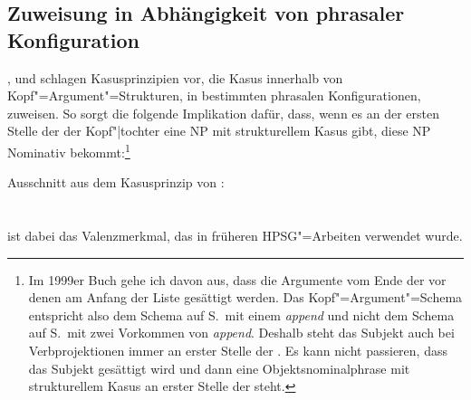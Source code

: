 \subsection{Zuweisung in Abhängigkeit von phrasaler Konfiguration}

\mbox{},  und 
schlagen Kasusprinzipien vor, die Kasus innerhalb von Kopf"=Argument"=Strukturen, \dash in bestimmten
phrasalen Konfigurationen, zuweisen. So sorgt \zb die folgende Implikation dafür,
dass, wenn es an der ersten Stelle der \subcatl der Kopf"|tochter eine NP mit strukturellem
Kasus gibt, diese NP Nominativ bekommt:\footnote{
  Im 1999er Buch gehe ich davon aus, dass die Argumente vom Ende der \subcatl vor denen am Anfang der
  Liste gesättigt werden. Das Kopf"=Argument"=Schema entspricht also dem Schema auf
  S.\,\pageref{schema-bin-prel} mit einem \emph{append} und nicht dem Schema auf
  S.\,\pageref{schema-Kopf-Komplementschema-prel2} mit zwei Vorkommen von \emph{append}. Deshalb steht das Subjekt auch bei
  Verbprojektionen immer an erster Stelle der \subcatl. Es kann nicht passieren, dass das Subjekt
  gesättigt wird und dann eine Objektsnominalphrase mit strukturellem Kasus an erster Stelle der \subcatl steht.%
}

\eas
{}%
Ausschnitt aus dem Kasusprinzip von :\\
 ~\impl \\\\
\hfill{}
\zs
\subcat ist dabei das Valenzmerkmal, das in früheren HPSG"=Arbeiten verwendet wurde.

